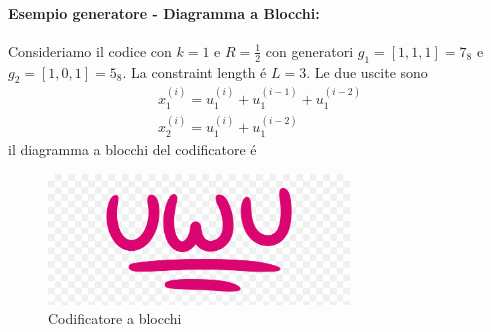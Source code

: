             \paragraph{Esempio generatore - Diagramma a Blocchi:}
            Consideriamo il codice con $k=1$ e $R=\frac{1}{2}$ con generatori $g_1 = [1,1,1] = 7_8$ e $g_2 = [1,0,1] = 5_8$.
            La constraint length é $L=3$.
            Le due uscite sono 
            \begin{gather}
                x_1^{(i)} = u_1^{(i)} + u_1^{(i-1)}+u_1^{(i-2)}\nonumber \\
                x_2^{(i)} = u_1^{(i)} + u_1^{(i-2)}\nonumber
            \end{gather}
            il diagramma a blocchi del codificatore é 
            \begin{figure}[H]
                \centering
                \includegraphics[width = 8cm]{media/uwu.png}
                \caption{Codificatore a blocchi}
            \end{figure}
            
